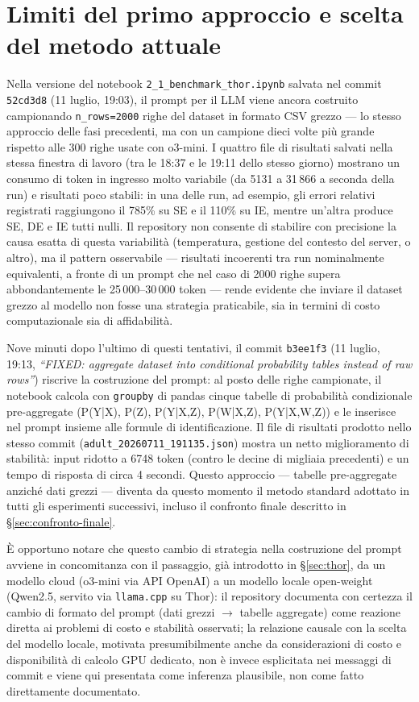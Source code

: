 \section{Limiti del primo approccio e scelta del metodo attuale}
\label{sec:limiti}

Nella versione del notebook \texttt{2\_1\_benchmark\_thor.ipynb} salvata nel commit \texttt{52cd3d8} (11 luglio, 19:03), il prompt per il LLM viene ancora costruito campionando \texttt{n\_rows=2000} righe del dataset in formato CSV grezzo --- lo stesso approccio delle fasi precedenti, ma con un campione dieci volte più grande rispetto alle 300 righe usate con o3-mini. I quattro file di risultati salvati nella stessa finestra di lavoro (tra le 18:37 e le 19:11 dello stesso giorno) mostrano un consumo di token in ingresso molto variabile (da 5131 a 31\,866 a seconda della run) e risultati poco stabili: in una delle run, ad esempio, gli errori relativi registrati raggiungono il 785\% su SE e il 110\% su IE, mentre un'altra produce SE, DE e IE tutti nulli. Il repository non consente di stabilire con precisione la causa esatta di questa variabilità (temperatura, gestione del contesto del server, o altro), ma il pattern osservabile --- risultati incoerenti tra run nominalmente equivalenti, a fronte di un prompt che nel caso di 2000 righe supera abbondantemente le 25\,000--30\,000 token --- rende evidente che inviare il dataset grezzo al modello non fosse una strategia praticabile, sia in termini di costo computazionale sia di affidabilità.

Nove minuti dopo l'ultimo di questi tentativi, il commit \texttt{b3ee1f3} (11 luglio, 19:13, \emph{``FIXED: aggregate dataset into conditional probability tables instead of raw rows''}) riscrive la costruzione del prompt: al posto delle righe campionate, il notebook calcola con \texttt{groupby} di pandas cinque tabelle di probabilità condizionale pre-aggregate (P(Y|X), P(Z), P(Y|X,Z), P(W|X,Z), P(Y|X,W,Z)) e le inserisce nel prompt insieme alle formule di identificazione. Il file di risultati prodotto nello stesso commit (\texttt{adult\_20260711\_191135.json}) mostra un netto miglioramento di stabilità: input ridotto a 6748 token (contro le decine di migliaia precedenti) e un tempo di risposta di circa 4 secondi. Questo approccio --- tabelle pre-aggregate anziché dati grezzi --- diventa da questo momento il metodo standard adottato in tutti gli esperimenti successivi, incluso il confronto finale descritto in \S\ref{sec:confronto-finale}.

È opportuno notare che questo cambio di strategia nella costruzione del prompt avviene in concomitanza con il passaggio, già introdotto in \S\ref{sec:thor}, da un modello cloud (o3-mini via API OpenAI) a un modello locale open-weight (Qwen2.5, servito via \texttt{llama.cpp} su Thor): il repository documenta con certezza il cambio di formato del prompt (dati grezzi $\to$ tabelle aggregate) come reazione diretta ai problemi di costo e stabilità osservati; la relazione causale con la scelta del modello locale, motivata presumibilmente anche da considerazioni di costo e disponibilità di calcolo GPU dedicato, non è invece esplicitata nei messaggi di commit e viene qui presentata come inferenza plausibile, non come fatto direttamente documentato.
